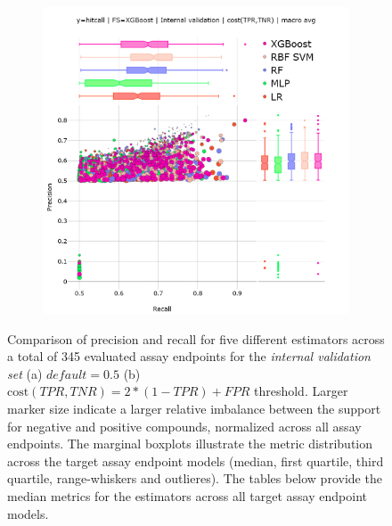 \begin{figure}[h]
\begin{subfigure}[b]{0.495\textwidth}
      \includegraphics[width=\textwidth]{generated_results/hitcall_classification_Feature_Selection_XGBClassifier_val_optimal_macro_avg.png}
      \caption{}
      \label{fig:hitcall_classification_Feature_Selection_XGBClassifier_val_optimal_macro_avg}
  \end{subfigure}
  \caption{Comparison of precision and recall for five different estimators across a total of 345 evaluated assay endpoints for the \emph{internal validation set} (a)  $default = 0.5$  (b) $\text{cost}(TPR, TNR) = 2 * (1 - TPR) + FPR$ threshold. Larger marker size indicate a larger relative imbalance between the support for negative and positive compounds, normalized across all assay endpoints. The marginal boxplots illustrate the metric distribution across the target assay endpoint models (median, first quartile, third quartile, range-whiskers and outlieres). The tables below provide the median metrics for the estimators across all target assay endpoint models.}
  \label{fig:hitcall_classification_Feature_Selection_XGBClassifier_val_default_optimal_macro_avg}
\end{figure}




\newpage

